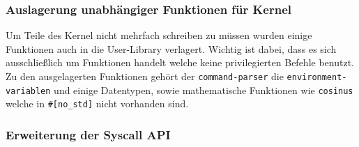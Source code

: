     \subsubsection{Auslagerung unabhängiger Funktionen für Kernel}
    Um Teile des Kernel nicht mehrfach schreiben zu müssen wurden einige Funktionen auch in die User-Library verlagert. Wichtig ist dabei, dass es sich ausschließlich um Funktionen handelt welche keine privilegierten Befehle benutzt. Zu den ausgelagerten Funktionen gehört der \verb|command-parser| die \verb|environment-variablen| und einige Datentypen, sowie mathematische Funktionen wie \verb|cosinus| welche in \verb|#[no_std]| nicht vorhanden sind.


    \subsubsection{Erweiterung der Syscall API}